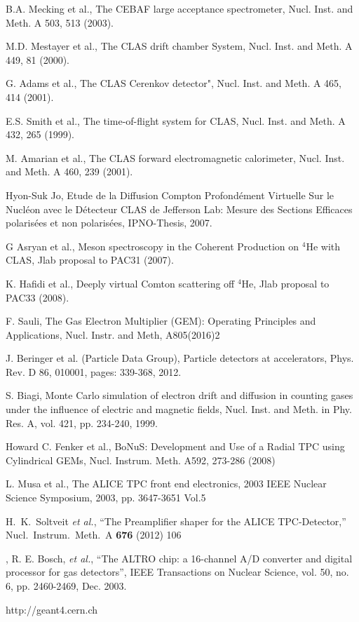 \documentclass[twocolumn,showpacs,superscriptaddress,groupedaddress]{revtex4}
\begin{document}
\begin{thebibliography}{99}

   B.A. Mecking et al., The CEBAF large acceptance spectrometer, Nucl. Inst. 
   and Meth. A 503, 513 (2003).

   M.D. Mestayer et al., The CLAS drift chamber System, Nucl. Inst.  and Meth.  
   A 449, 81 (2000).

   G. Adams et al., The CLAS Cerenkov detector", Nucl. Inst. and Meth. A 465, 
   414 (2001).

   E.S. Smith et al., The time-of-flight system for CLAS, Nucl.  Inst. and 
   Meth. A 432, 265 (1999).

   M. Amarian et al., The CLAS forward electromagnetic calorimeter, Nucl.  
   Inst. and Meth. A 460, 239 (2001). 

   Hyon-Suk Jo, Etude de la Diffusion Compton Profond{\'e}ment Virtuelle Sur le 
   Nucl{\'e}on avec le D{\'e}tecteur CLAS de Jefferson Lab: Mesure des Sections 
   Efficaces polaris{\'e}es et non polaris{\'e}es, IPNO-Thesis, 2007.

   G Asryan et al., Meson spectroscopy in the Coherent Production on $^{4}$He with CLAS, Jlab 
   proposal to PAC31 (2007).

   K. Hafidi et al., Deeply virtual Comton scattering off $^{4}$He, Jlab 
   proposal to PAC33 (2008).

   F. Sauli, The Gas Electron Multiplier (GEM): Operating Principles and 
   Applications, Nucl. Instr. and Meth, A805(2016)2

   J. Beringer et al. (Particle Data Group), Particle detectors at 
   accelerators, Phys. Rev. D 86, 010001, pages: 339-368, 2012.

   S. Biagi, Monte Carlo simulation of electron drift and diffusion in counting 
   gases under the influence of electric and magnetic fields, Nucl.  Inst. and 
   Meth. in Phy. Res. A, vol. 421, pp. 234-240, 1999.

   Howard C. Fenker et al., BoNuS: Development and Use of a Radial TPC using 
   Cylindrical GEMs, Nucl. Instrum. Meth. A592, 273-286 (2008)

 L. Musa et al., The ALICE TPC front end electronics, 2003 IEEE Nuclear 
 Science Symposium, 2003, pp. 3647-3651 Vol.5
 
   H.~K.~Soltveit {\it et al.},
   ``The Preamplifier shaper for the ALICE TPC-Detector,''
   Nucl.\ Instrum.\ Meth.\ A {\bf 676} (2012) 106
 
 ,
 R. E. Bosch, {\it et al.}, ``The ALTRO chip: a 16-channel A/D converter and 
 digital processor for gas detectors'', IEEE Transactions on Nuclear Science, 
 vol. 50, no. 6, pp. 2460-2469, Dec. 2003.

http://geant4.cern.ch
 	

\end{thebibliography}
\end{document}
